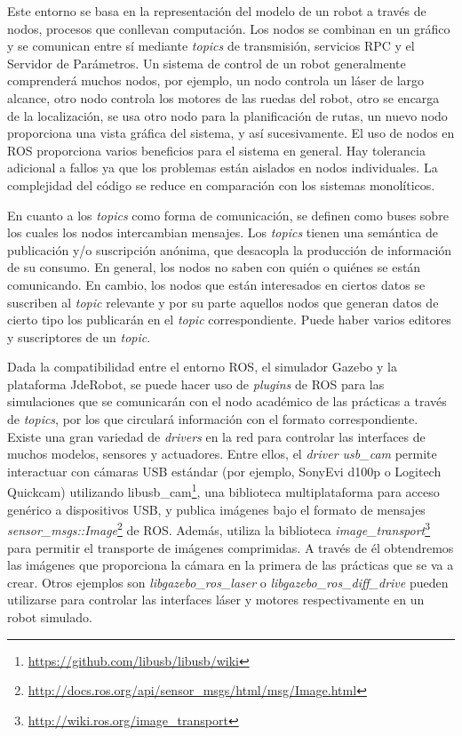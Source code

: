 Este entorno se basa en la representación del modelo de un robot a través de nodos, procesos que conllevan computación. Los nodos se combinan en un gráfico y se comunican entre sí mediante \textit{topics} de transmisión, servicios RPC y el Servidor de Parámetros. Un sistema de control de un robot generalmente comprenderá muchos nodos, por ejemplo, un nodo controla un láser de largo alcance, otro nodo controla los motores de las ruedas del robot, otro se encarga de la localización, se usa otro nodo para la planificación de rutas, un nuevo nodo proporciona una vista gráfica del sistema, y así sucesivamente. El uso de nodos en ROS proporciona varios beneficios para el sistema en general. Hay tolerancia adicional a fallos ya que los problemas están aislados en nodos individuales. La complejidad del código se reduce en comparación con los sistemas monolíticos.

En cuanto a los \textit{topics} como forma de comunicación, se definen como buses sobre los cuales los nodos intercambian mensajes. Los \textit{topics} tienen una semántica de publicación y/o suscripción anónima, que desacopla la producción de información de su consumo. En general, los nodos no saben con quién o quiénes se están comunicando. En cambio, los nodos que están interesados en ciertos datos se suscriben al \textit{topic} relevante y por su parte aquellos nodos que generan datos de cierto tipo los publicarán en el \textit{topic} correspondiente. Puede haber varios editores y suscriptores de un \textit{topic}.

Dada la compatibilidad entre el entorno ROS, el simulador Gazebo y la plataforma JdeRobot, se puede hacer uso de \textit{plugins} de ROS para las simulaciones que se comunicarán con el nodo académico de las prácticas a través de \textit{topics}, por los que circulará información con el formato correspondiente. Existe una gran variedad de \textit{drivers} en la red para controlar las interfaces de muchos modelos, sensores y actuadores. Entre ellos, el \textit{driver usb\_cam} permite interactuar con cámaras USB estándar (por ejemplo, SonyEvi d100p o Logitech Quickcam) utilizando libusb\_cam\footnote{\url{https://github.com/libusb/libusb/wiki}}, una biblioteca multiplataforma para acceso genérico a dispositivos USB, y publica imágenes bajo el formato de mensajes \textit{sensor\_msgs::Image}\footnote{\url{http://docs.ros.org/api/sensor\_msgs/html/msg/Image.html}} 
 de ROS. Además, utiliza la biblioteca \textit{image\_transport}\footnote{\url{http://wiki.ros.org/image\_transport}} para permitir el transporte de imágenes comprimidas. A través de él obtendremos las imágenes que proporciona la cámara en la primera de las prácticas que se va a crear. Otros ejemplos son \textit{libgazebo\_ros\_laser} o \textit{libgazebo\_ros\_diff\_drive} pueden utilizarse para controlar las interfaces láser y motores respectivamente en un robot simulado.

